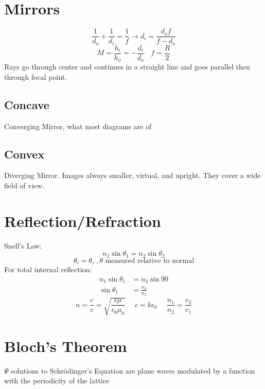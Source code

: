 \documentclass[10pt,letter]{article}
\begin{document}
\section{Mirrors} %
\label{sec:mirrors}
\begin{equation}
    \frac{1}{d_o} + \frac{1}{d_i} = \frac{1}{f} \rightarrow d_i = \frac{d_o f}{f - d_o}
\end{equation}
\begin{equation}
    M = \frac{h_i}{h_o} = -\frac{d_i}{d_o}~~~~ f = \frac{R}{2}
\end{equation}
Rays go through center and continues in a straight line and goes parallel then through focal point.
\subsection{Concave} %
\label{sub:concave}
Converging Mirror, what most diagrams are of
\subsection{Convex} %
\label{sub:convex}
Diverging Mirror. Images always smaller, virtual, and upright. They cover a wide field of view.

\section{Reflection/Refraction} %
\label{sec:reflection_rrefraction}
Snell's Law:
\begin{equation}
    n_1 \sin \theta_1 = n_2 \sin \theta_2
\end{equation}
\begin{equation}
    \theta_i = \theta_r~, \theta \textrm{ measured relative to normal}
\end{equation}
For total internal reflection:
\begin{align}
    n_1 \sin \theta_1 &= n_2 \sin 90\\
    \sin \theta_1 &= \frac{n_2}{n_1}
\end{align}
\begin{equation}
    n = \frac{c}{v} = \sqrt{\frac{\epsilon \mu}{\epsilon_0 \mu_0} } ~~~~~~ \epsilon = k \epsilon_0 ~~~~~~ \frac{n_1}{n_2} = \frac{v_2}{v_1}
\end{equation}

\section{Bloch's Theorem} %
\label{sec:bloch_s_theorem}
$\Psi$ solutions to Schr\"odinger's Equation are plane waves modulated by a function with the periodicity of the lattice
\end{document}
